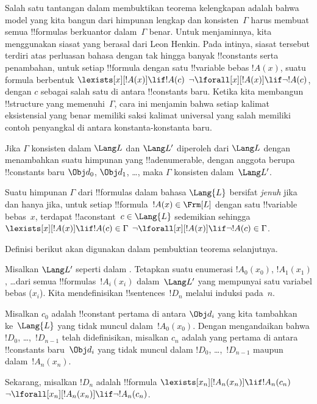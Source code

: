 \documentclass[../../../include/open-logic-section]{subfiles}
\begin{document}


\begin{explain}
Salah satu tantangan dalam membuktikan teorema kelengkapan adalah bahwa
model yang kita bangun dari himpunan lengkap dan konsisten~$\Gamma$ harus
membuat semua !!{formula}s berkuantor dalam~$\Gamma$ benar. Untuk
menjaminnya, kita menggunakan siasat yang berasal dari Leon Henkin. Pada
intinya, siasat tersebut terdiri atas perluasan bahasa dengan tak hingga
banyak !!{constant}s serta penambahan, untuk setiap !!{formula} dengan
satu !!{variable} bebas $!A(x)$, suatu formula berbentuk
      {$\lexists[x][!A(x)] \lif !A(c)$}
      {$\lnot\lforall[x][!A(x)] \lif \lnot !A(c)$},
dengan $c$ sebagai salah satu di antara !!{constant}s baru. Ketika kita membangun
!!{structure} yang memenuhi~$\Gamma$, cara ini menjamin bahwa setiap
{kalimat eksistensial yang benar memiliki saksi}
{kalimat universal yang salah memiliki contoh penyangkal}
di antara konstanta-konstanta baru.
\end{explain}

\begin{prop}
Jika $\Gamma$ konsisten dalam $\Lang L$ dan $\Lang L'$ diperoleh dari
$\Lang L$ dengan menambahkan suatu himpunan yang !!a{denumerable}, dengan
anggota berupa !!{constant}s baru $\Obj d_0$, $\Obj d_1$, \dots, maka $\Gamma$
konsisten dalam~$\Lang L'$.
\end{prop}

\begin{defn}
Suatu himpunan $\Gamma$ dari !!{formula}s dalam bahasa $\Lang {L}$
bersifat \emph{jenuh} jika dan hanya jika, untuk setiap
!!{formula}~$!A(x) \in \Frm[L]$ dengan satu !!{variable} bebas~$x$,
terdapat !!a{constant}~$c \in \Lang{L}$ sedemikian sehingga
      {$\lexists[x][!A(x)] \lif !A(c) \in \Gamma$}
      {$\lnot\lforall[x][!A(x)] \lif \lnot !A(c) \in \Gamma$}.
\end{defn}

Definisi berikut akan digunakan dalam pembuktian teorema selanjutnya.

\begin{defn}
Misalkan $\Lang L'$ seperti dalam . Tetapkan suatu
enumerasi $!A_0(x_0)$, $!A_1(x_1)$, \dots dari semua
!!{formula}s~$!A_i(x_i)$ dalam~$\Lang L'$ yang mempunyai satu variabel
bebas ($x_i$). Kita mendefinisikan !!{sentence}s~$!D_n$ melalui
induksi pada~$n$.

Misalkan $c_0$ adalah !!{constant} pertama di antara $\Obj d_i$ yang
kita tambahkan ke~$\Lang{L}$ yang tidak muncul dalam~$!A_0(x_0)$.
Dengan mengandaikan bahwa $!D_0$, \dots,~$!D_{n-1}$ telah didefinisikan,
misalkan $c_n$ adalah yang pertama di antara !!{constant}s baru~$\Obj d_i$ yang tidak
muncul dalam $!D_0$, \dots,~$!D_{n-1}$ maupun dalam~$!A_n(x_n)$.

Sekarang, misalkan $!D_{n}$ adalah !!{formula} 
{$\lexists[x_{n}][!A_{n}(x_{n})] \lif
  !A_{n}(c_{n})$}{$\lnot\lforall[x_{n}][!A_{n}(x_{n})] \lif \lnot
  !A_{n}(c_{n})$}.
\end{defn}
\end{document}
